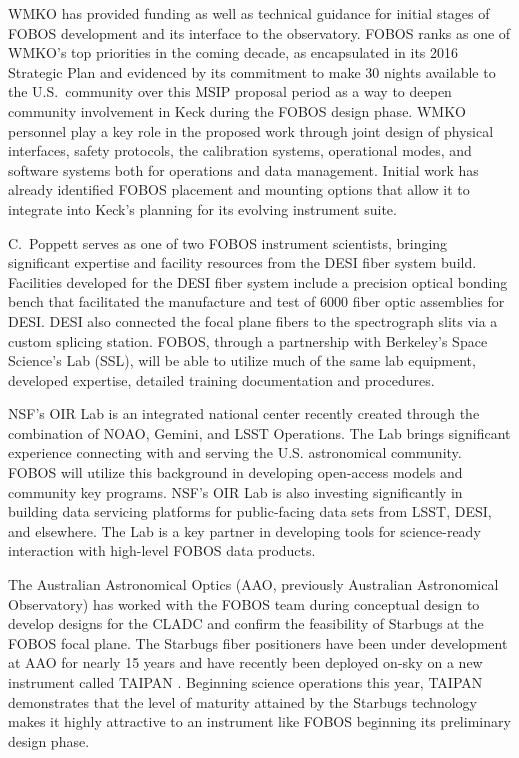 \documentclass[oneside,11pt]{amsart}
\begin{document}
 WMKO has provided funding as well as technical guidance for initial stages of FOBOS development and its interface to
the observatory.  FOBOS ranks as one of WMKO's top priorities in the coming decade, as encapsulated in its 2016
Strategic Plan and evidenced by its commitment to make 30 nights available to the U.S.\ community over this MSIP
proposal period as a way to deepen community involvement in Keck during the FOBOS design phase. WMKO personnel play a
key role in the proposed work through joint design of physical interfaces, safety protocols, the calibration systems,
operational modes, and software systems both for operations and data management.  Initial work has already identified
FOBOS placement and mounting options that allow it to integrate into Keck's planning for its evolving instrument suite.

 C.~Poppett serves as one of two FOBOS instrument scientists,
bringing significant expertise and facility resources from the DESI fiber system build.  Facilities developed for the
DESI fiber system include a precision optical bonding bench that facilitated the manufacture and test of 6000 fiber
optic assemblies for DESI. DESI also connected the focal plane fibers to the spectrograph slits via a custom splicing
station.  FOBOS, through a partnership with Berkeley's Space Science's Lab (SSL), will be able to utilize much of the
same lab equipment, developed expertise, detailed training documentation and procedures.

  NSF’s OIR Lab is an integrated national center recently created through the
combination of NOAO, Gemini, and LSST Operations. The Lab brings significant experience connecting with and serving the
U.S. astronomical community. FOBOS will utilize this background in developing open-access models and community key
programs. NSF’s OIR Lab is also investing significantly in building data servicing platforms for public-facing data
sets from LSST, DESI, and elsewhere. The Lab is a key partner in developing tools for science-ready interaction with
high-level FOBOS data products.

 The Australian Astronomical Optics (AAO, previously Australian
Astronomical Observatory) has worked with the FOBOS team during conceptual design to develop designs for the CLADC and
confirm the feasibility of Starbugs at the FOBOS focal plane.  The Starbugs fiber positioners have been under
development at AAO for nearly 15 years and have recently been deployed on-sky on a new instrument called TAIPAN
\cite{staszak16}.  Beginning science operations this year, TAIPAN demonstrates that the level of maturity attained by
the Starbugs technology makes it highly attractive to an instrument like FOBOS beginning its preliminary design phase.
\end{document}
